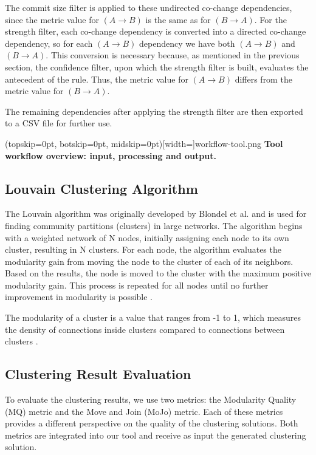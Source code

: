 \documentclass{ieeeaccess}
\begin{document}
The commit size filter is applied to these undirected co-change dependencies, since the metric value for $(A \rightarrow B)$ is the same as for $(B \rightarrow A)$. For the strength filter, each co-change dependency is converted into a directed co-change dependency, so for each $(A \rightarrow B)$ dependency we have both $(A \rightarrow B)$ and $(B \rightarrow A)$. This conversion is necessary because, as mentioned in the previous section, the confidence filter, upon which the strength filter is built, evaluates the antecedent of the rule. Thus, the metric value for $(A \rightarrow B)$ differs from the metric value for $(B \rightarrow A)$.

The remaining dependencies after applying the strength filter are then exported to a CSV file for further use.

\Figure[t!](topskip=0pt, botskip=0pt, midskip=0pt)[width=\textwidth]{workflow-tool.png}
{ \textbf{Tool workflow overview: input, processing and output.}\label{fig:tool}}

\subsection{Louvain Clustering Algorithm}
\label{subsec:louvain}

The Louvain algorithm was originally developed by Blondel et al. and is used for finding community partitions (clusters) in large networks. The algorithm begins with a weighted network of N nodes, initially assigning each node to its own cluster, resulting in N clusters. For each node, the algorithm evaluates the modularity gain from moving the node to the cluster of each of its neighbors. Based on the results, the node is moved to the cluster with the maximum positive modularity gain. This process is repeated for all nodes until no further improvement in modularity is possible \cite{b8}.

The modularity of a cluster is a value that ranges from -1 to 1, which measures the density of connections inside clusters compared to connections between clusters \cite{b9}.

\subsection{Clustering Result Evaluation}
\label{subsec:evaluation_def}

To evaluate the clustering results, we use two metrics: the Modularity Quality (MQ) metric and the Move and Join (MoJo) metric. Each of these metrics provides a different perspective on the quality of the clustering solutions. Both metrics are integrated into our tool and receive as input the generated clustering solution.
\end{document}
